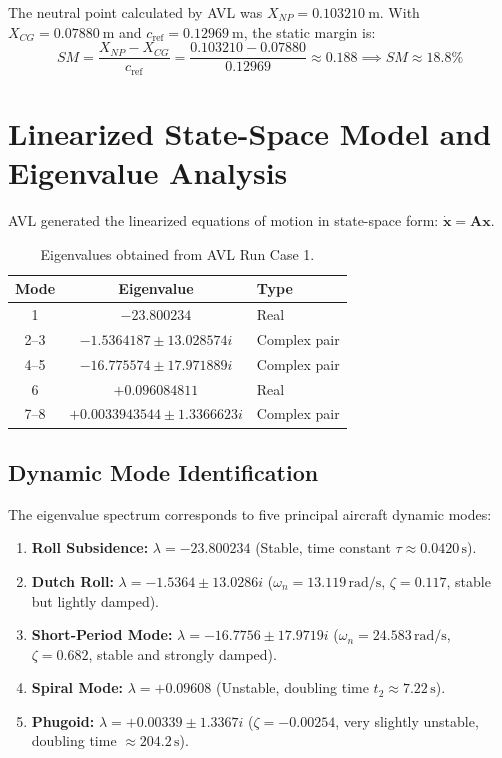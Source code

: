 \documentclass[11pt,a4paper]{article}
\begin{document}
The neutral point calculated by AVL was $X_{NP}=0.103210~\mathrm{m}$. With $X_{CG}=0.07880~\mathrm{m}$ and $c_{\mathrm{ref}}=0.12969~\mathrm{m}$, the static margin is:
\begin{equation}
SM = \frac{X_{NP}-X_{CG}}{c_{\mathrm{ref}}} = \frac{0.103210-0.07880}{0.12969} \approx 0.188 \implies \boxed{SM\approx18.8\%}
\end{equation}

\section{Linearized State-Space Model and Eigenvalue Analysis}

AVL generated the linearized equations of motion in state-space form: $\dot{\mathbf{x}}=\mathbf{A}\mathbf{x}$.

\begin{table}[H]
\centering
\caption{Eigenvalues obtained from AVL Run Case 1.}
\label{tab:eigenvalues}
\begin{tabular}{ccl}
\toprule
Mode & Eigenvalue & Type \\
\midrule
1 & $-23.800234$ & Real \\
2--3 & $-1.5364187\pm13.028574i$ & Complex pair \\
4--5 & $-16.775574\pm17.971889i$ & Complex pair \\
6 & $+0.096084811$ & Real \\
7--8 & $+0.0033943544\pm1.3366623i$ & Complex pair \\
\bottomrule
\end{tabular}
\end{table}

\subsection{Dynamic Mode Identification}
The eigenvalue spectrum corresponds to five principal aircraft dynamic modes:
\begin{enumerate}
    \item \textbf{Roll Subsidence:} $\lambda = -23.800234$ (Stable, time constant $\tau \approx 0.0420\,\text{s}$).
    \item \textbf{Dutch Roll:} $\lambda = -1.5364 \pm 13.0286i$ ($\omega_n = 13.119\,\text{rad/s}$, $\zeta = 0.117$, stable but lightly damped).
    \item \textbf{Short-Period Mode:} $\lambda = -16.7756 \pm 17.9719i$ ($\omega_n = 24.583\,\text{rad/s}$, $\zeta = 0.682$, stable and strongly damped).
    \item \textbf{Spiral Mode:} $\lambda = +0.09608$ (Unstable, doubling time $t_2 \approx 7.22\,\text{s}$).
    \item \textbf{Phugoid:} $\lambda = +0.00339 \pm 1.3367i$ ($\zeta = -0.00254$, very slightly unstable, doubling time $\approx 204.2\,\text{s}$).
\end{enumerate}
\end{document}

